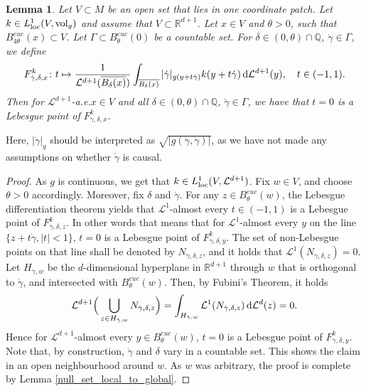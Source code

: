 \documentclass[a4paper,10pt]{article}
\newtheorem{lemma}[theorem]{Lemma}
\numberwithin{equation}{section}
\newcommand{\R}{\mathbb{R}}
\newcommand{\Q}{\mathbb{Q}}
\newcommand{\vol}{\mathrm{vol}}
\newcommand{\di}{{\rm d}}
\begin{document}
\smallskip
\begin{lemma}\label{Lebesguepointsadvanced_lor} 
Let $V \subset M$ be an open set that lies in one coordinate patch.
Let $k \in L^1_{\rm{loc}}(V, \vol_g)$ and assume that $V \subset \R^{d+1}$. Let $x \in V$  and $\theta > 0$, such that $B_{4\theta}^{euc}(x) \subset V$. Let $\Gamma \subset B_\theta^{euc}(0)$ be a countable set.
For $\delta \in (0, \theta)\cap \Q$, $\dot{\gamma} \in \Gamma$,  we define 
    \begin{align*}
        F^k_{\dot{\gamma}, \delta, x}\colon  t \mapsto \frac{1}{\mathcal{L}^{d+1}(\overline{B_\delta(x)})}\int_{\overline{B_\delta(x)}} |\dot{\gamma}|_{g(y + t\dot{\gamma})}k(y + t\dot{\gamma})\,\di\mathcal{L}^{d+1}(y), \quad  t \in (-1, 1).
    \end{align*}
    Then for $\mathcal{L}^{d+1}$-a.e.\;$x \in V$ and all {$\delta \in (0, \theta)\cap \Q$}, $\dot{\gamma} \in \Gamma$, we have that $t=0$ is a Lebesgue point of $ F^k_{\dot{\gamma}, \delta, x}$.
\end{lemma}
Here, $|\dot{\gamma}|_g$ should be interpreted as $\sqrt{|g(\dot{\gamma}, \dot{\gamma})|}$, as we have not made any assumptions on whether $\dot{\gamma}$ is causal.
 \begin{proof}
     As $g$ is continuous, we get that $k \in L^1_{\rm{loc}}(V, \mathcal{L}^{d+1})$.
     Fix $w \in V$, and choose $\theta > 0$ accordingly. Moreover, fix $\delta$ and $\dot{\gamma}$. For any $z \in B^{euc}_\theta(w)$, the Lebesgue differentiation theorem yields that $\mathcal{L}^1$-almost every $t \in (-1, 1)$ is a Lebesgue point of $ F^k_{\dot{\gamma}, \delta, z}$. 
     In other words that means that for $\mathcal{L}^1$-almost every $y$ on the line $\{z+t\dot{\gamma}, |t| <1\}$, $t=0$ is a Lebesgue point of $ F^k_{\dot{\gamma}, \delta, y}$. The set of non-Lebesgue points on that line shall be denoted by $N_{\dot{\gamma}, \delta, z}$, and it holds that $\mathcal{L}^1(N_{\dot{\gamma}, \delta, z})=0$. Let $H_{\dot{\gamma}, w}$ be the $d$-dimensional hyperplane in $\R^{d+1}$ through $w$ that is orthogonal to $\dot{\gamma}$, and intersected with $B^{euc}_{\theta}(w)$. Then, by Fubini's Theorem, it holds
     \begin{align*}
         \mathcal{L}^{d+1}\Big(\bigcup_{z \in H_{\dot{\gamma}, w}}N_{\dot{\gamma}, \delta, z}\Big) = \int_{ H_{\dot{\gamma}, w}} \mathcal{L}^1(N_{\dot{\gamma}, \delta, z}) \, \di\mathcal{L}^{d}(z) = 0. 
     \end{align*}
     Hence for $\mathcal{L}^{d+1}$-almost every $y \in B^{euc}_\theta(w)$, $t=0$ is a Lebesgue point of $ F^k_{\dot{\gamma}, \delta, y}$. Note that, by construction,   $\dot{\gamma}$ and $\delta$  vary in a countable set. This shows the claim in an open neighbourhood around $w$. As $w$ was arbitrary, the proof is complete by Lemma \ref{null_set_local_to_global}. 
 \end{proof}
\end{document}
